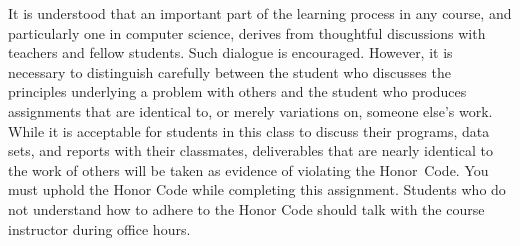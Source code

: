 \documentclass[11pt]{article}
\begin{document}
It is understood that an important part of the learning process in any course,
and particularly one in computer science, derives from thoughtful discussions
with teachers and fellow students. Such dialogue is encouraged. However, it is
necessary to distinguish carefully between the student who discusses the
principles underlying a problem with others and the student who produces
assignments that are identical to, or merely variations on, someone else's work.
While it is acceptable for students in this class to discuss their programs,
data sets, and reports with their classmates, deliverables that are nearly
identical to the work of others will be taken as evidence of violating the
\mbox{Honor Code}. You must uphold the Honor Code while completing this
assignment. Students who do not understand how to adhere to the Honor Code
should talk with the course instructor during office hours.
\end{document}
